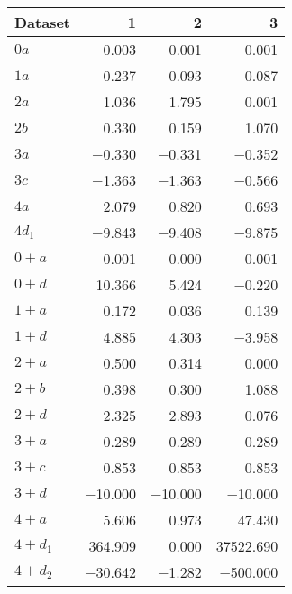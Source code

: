 \begin{tabular}{lrrr}
\toprule
 Dataset   &       1 &       2 &         3 \\
\midrule
 $0 a$     &   \num{0.003} &   \num{0.001} &     \num{0.001} \\
 $1 a$     &   \num{0.237} &   \num{0.093} &     \num{0.087} \\
 $2 a$     &   \num{1.036} &   \num{1.795} &     \num{0.001} \\
 $2 b$     &   \num{0.330} &   \num{0.159} &     \num{1.070} \\
 $3 a$     &  \num{-0.330} &  \num{-0.331} &    \num{-0.352} \\
 $3 c$     &  \num{-1.363} &  \num{-1.363} &    \num{-0.566} \\
 $4 a$     &   \num{2.079} &   \num{0.820} &     \num{0.693} \\
 $4 d_1$   &  \num{-9.843} &  \num{-9.408} &    \num{-9.875} \\
 $0+ a$    &   \num{0.001} &   \num{0.000} &     \num{0.001} \\
 $0+ d$    &  \num{10.366} &   \num{5.424} &    \num{-0.220} \\
 $1+ a$    &   \num{0.172} &   \num{0.036} &     \num{0.139} \\
 $1+ d$    &   \num{4.885} &   \num{4.303} &    \num{-3.958} \\
 $2+ a$    &   \num{0.500} &   \num{0.314} &     \num{0.000} \\
 $2+ b$    &   \num{0.398} &   \num{0.300} &     \num{1.088} \\
 $2+ d$    &   \num{2.325} &   \num{2.893} &     \num{0.076} \\
 $3+ a$    &   \num{0.289} &   \num{0.289} &     \num{0.289} \\
 $3+ c$    &   \num{0.853} &   \num{0.853} &     \num{0.853} \\
 $3+ d$    & \num{-10.000} & \num{-10.000} &   \num{-10.000} \\
 $4+ a$    &   \num{5.606} &   \num{0.973} &    \num{47.430} \\
 $4+ d_1$  & \num{364.909} &   \num{0.000} & \num{37522.690} \\
 $4+ d_2$  & \num{-30.642} &  \num{-1.282} &  \num{-500.000} \\
\bottomrule
\end{tabular}